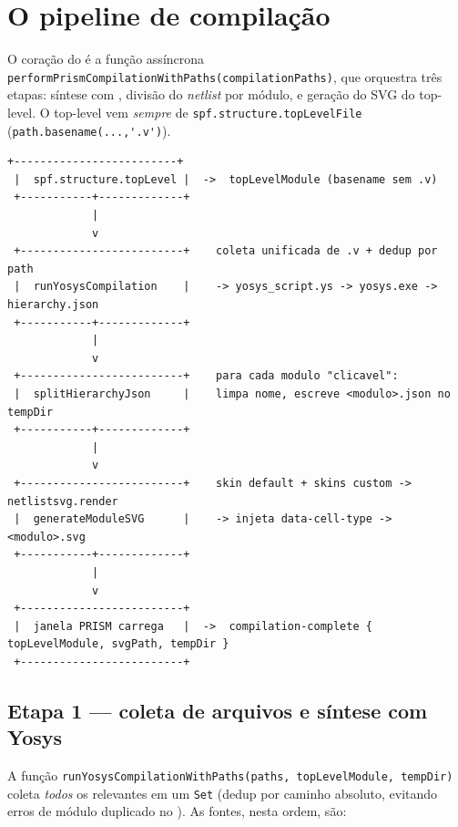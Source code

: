 \section{O pipeline de compilação}

O coração do  é a função assíncrona
\lstinline|performPrismCompilationWithPaths(compilationPaths)|, que orquestra
três etapas: síntese com , divisão do \emph{netlist} por módulo, e
geração do SVG do top-level. O top-level vem \emph{sempre} de
\lstinline|spf.structure.topLevelFile| (\lstinline|path.basename(...,'.v')|).

\begin{lstlisting}[caption={Diagrama de fluxo do pipeline (main/ipc/prism.js)}]
 +-------------------------+
 |  spf.structure.topLevel |  ->  topLevelModule (basename sem .v)
 +-----------+-------------+
             |
             v
 +-------------------------+    coleta unificada de .v + dedup por path
 |  runYosysCompilation    |    -> yosys_script.ys -> yosys.exe -> hierarchy.json
 +-----------+-------------+
             |
             v
 +-------------------------+    para cada modulo "clicavel":
 |  splitHierarchyJson     |    limpa nome, escreve <modulo>.json no tempDir
 +-----------+-------------+
             |
             v
 +-------------------------+    skin default + skins custom -> netlistsvg.render
 |  generateModuleSVG      |    -> injeta data-cell-type -> <modulo>.svg
 +-----------+-------------+
             |
             v
 +-------------------------+
 |  janela PRISM carrega   |  ->  compilation-complete { topLevelModule, svgPath, tempDir }
 +-------------------------+
\end{lstlisting}

\subsection{Etapa 1 --- coleta de arquivos e síntese com Yosys}

A função \lstinline|runYosysCompilationWithPaths(paths, topLevelModule, tempDir)|
coleta \emph{todos} os  relevantes em um \lstinline|Set| (dedup por
caminho absoluto, evitando erros de módulo duplicado no ). As fontes,
nesta ordem, são:

